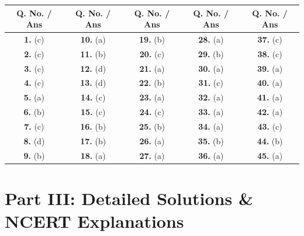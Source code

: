\documentclass[11pt, a4paper]{article}
\begin{document}
\begin{center}
\begin{tabular}{@{}ccccc@{}}
    \toprule
    \textbf{Q. No. / Ans} & \textbf{Q. No. / Ans} & \textbf{Q. No. / Ans} & \textbf{Q. No. / Ans} & \textbf{Q. No. / Ans} \\
    \midrule
    \textbf{1.} (c) & \textbf{10.} (a) & \textbf{19.} (b) & \textbf{28.} (a) & \textbf{37.} (c) \\
    \textbf{2.} (c) & \textbf{11.} (b) & \textbf{20.} (c) & \textbf{29.} (b) & \textbf{38.} (c) \\
    \textbf{3.} (c) & \textbf{12.} (d) & \textbf{21.} (a) & \textbf{30.} (a) & \textbf{39.} (a) \\
    \textbf{4.} (c) & \textbf{13.} (d) & \textbf{22.} (b) & \textbf{31.} (c) & \textbf{40.} (a) \\
    \textbf{5.} (a) & \textbf{14.} (c) & \textbf{23.} (a) & \textbf{32.} (a) & \textbf{41.} (a) \\
    \textbf{6.} (b) & \textbf{15.} (c) & \textbf{24.} (c) & \textbf{33.} (a) & \textbf{42.} (a) \\
    \textbf{7.} (c) & \textbf{16.} (b) & \textbf{25.} (b) & \textbf{34.} (a) & \textbf{43.} (c) \\
    \textbf{8.} (d) & \textbf{17.} (b) & \textbf{26.} (a) & \textbf{35.} (b) & \textbf{44.} (b) \\
    \textbf{9.} (b) & \textbf{18.} (a) & \textbf{27.} (a) & \textbf{36.} (a) & \textbf{45.} (a) \\
    \bottomrule
\end{tabular}
\end{center}

\vspace{12pt}

\section*{\color{primary} Part III: Detailed Solutions \& NCERT Explanations}
\end{document}
